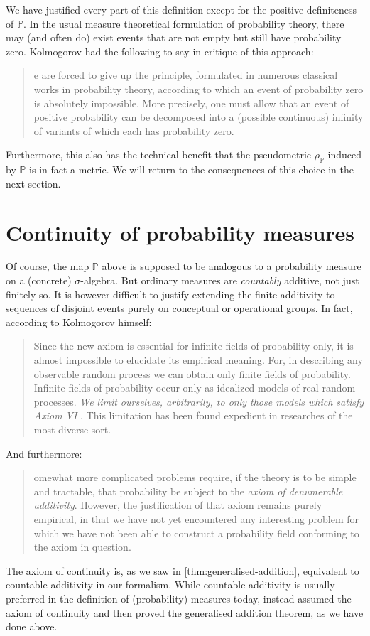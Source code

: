 \documentclass[article, a4paper, 11pt, oneside]{memoir}
\numberwithin{equation}{chapter}
\renewcommand{\P}{\mathbb{P}}
\begin{document}
We have justified every part of this definition except for the positive definiteness of $\P$. In the usual measure theoretical formulation of probability theory, there may (and often do) exist events that are not empty but still have probability zero. Kolmogorov had the following to say in critique of this approach:
%
\blockquote[\cite{kolmogorov1995}]{%
    e are forced to give up the principle, formulated in numerous classical works in probability theory, according to which an event of probability zero is absolutely impossible. More precisely, one must allow that an event of positive probability can be decomposed into a (possible continuous) infinity of variants of which each has probability
    zero.%
}
%
Furthermore, this also has the technical benefit that the pseudometric $\rho_\P$ induced by $\P$ is in fact a metric. We will return to the consequences of this choice in the next section.


\section{Continuity of probability measures}

Of course, the map $\P$ above is supposed to be analogous to a probability measure on a (concrete) $\sigma$-algebra. But ordinary measures are \emph{countably} additive, not just finitely so. It is however difficult to justify extending the finite additivity to sequences of disjoint events purely on conceptual or operational groups. In fact, according to Kolmogorov himself:
%
\blockquote[\cite{kolmogorov1956}]{%
    Since the new axiom  is essential for infinite fields of probability only, it is almost impossible to elucidate its empirical meaning. \textelp{} For, in describing any observable random process we can obtain only finite fields of probability. Infinite fields of probability occur only as idealized models of real random processes. \emph{We limit ourselves, arbitrarily, to only those models which satisfy Axiom VI} . This limitation has been found expedient in researches of the most diverse sort.%
}
%
And furthermore:
%
\blockquote[\cite{kolmogorov1995}]{%
    omewhat more complicated problems require, if the theory is to be simple and tractable, that probability be subject to the \emph{axiom of denumerable additivity}. However, the justification of that axiom remains purely empirical, in that we have not yet encountered any interesting problem for which we have not been able to construct a probability field conforming to the axiom in question.%
}
%
The axiom of continuity is, as we saw in \cref{thm:generalised-addition}, equivalent to countable additivity in our formalism. While countable additivity is usually preferred in the definition of (probability) measures today, \textcite{kolmogorov1956} instead assumed the axiom of continuity and then proved the generalised addition theorem, as we have done above.
\end{document}
